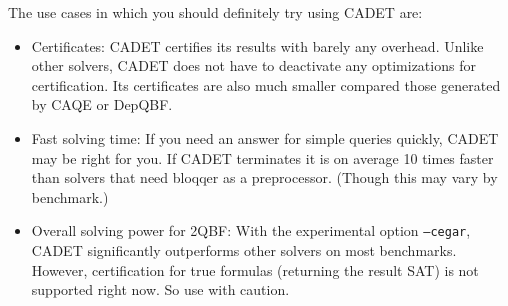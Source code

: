 \documentclass{article}
\begin{document}
The use cases in which you should definitely try using CADET are:
\begin{itemize}
	\item Certificates: CADET certifies its results with barely any overhead. 
		Unlike other solvers, CADET does not have to deactivate any optimizations for certification. 
		Its certificates are also much smaller compared those generated by CAQE or DepQBF. 
	\item Fast solving time: If you need an answer for simple queries quickly, CADET may be right for you. 
		If CADET terminates it is on average 10 times faster than solvers that need bloqqer as a preprocessor. 
		(Though this may vary by benchmark.)
	\item Overall solving power for 2QBF: With the experimental option \texttt{--cegar}, CADET significantly outperforms other solvers on most benchmarks. 
		However, certification for true formulas (returning the result SAT) is not supported right now. So use with caution. 
\end{itemize}




\end{document}
